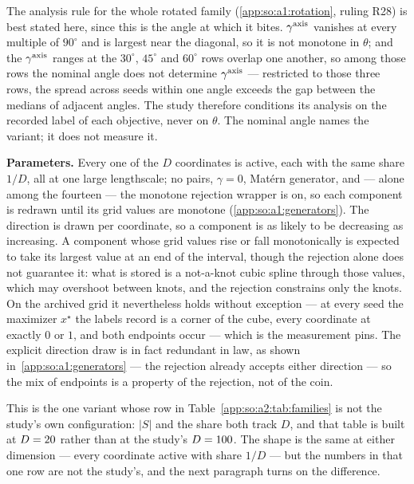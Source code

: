 The analysis rule for the whole rotated family (\ref{app:so:a1:rotation},
ruling R28) is best stated here, since this is the angle at which it bites.
$\gamma^{\mathrm{axis}}$ vanishes at every multiple of $90^\circ$ and is largest near the
diagonal, so it is not monotone in $\theta$; and the $\gamma^{\mathrm{axis}}$ ranges at the
$30^\circ$, $45^\circ$ and $60^\circ$ rows overlap one another, so among those
rows the nominal angle does not determine $\gamma^{\mathrm{axis}}$ --- restricted to those three
rows, the spread across seeds within one angle exceeds the gap between the
medians of adjacent angles. The study therefore conditions its analysis on the
recorded  label of each objective, never on $\theta$. The
nominal angle names the variant; it does not measure it.

\label{app:so:a2:dense-weak}

\textbf{Parameters.} Every one of the $D$ coordinates is active, each with the
same share $1/D$, all at one large lengthscale; no pairs, $\gamma=0$, Mat\'ern
generator, and --- alone among the fourteen --- the monotone rejection wrapper
is on, so each component is redrawn until its grid values are monotone
(\ref{app:so:a1:generators}). The direction is drawn per coordinate, so a
component is as likely to be decreasing as increasing. A component whose grid
values rise or fall monotonically is expected to take its largest value at an
end of the interval, though the rejection alone does not guarantee it: what is
stored is a not-a-knot cubic spline through those values, which may overshoot
between knots, and the rejection constrains only the knots. On the archived grid
it nevertheless holds without exception --- at every seed the maximizer
$x^\star$ the labels record is a corner of the cube, every coordinate at exactly
$0$ or $1$, and both endpoints occur --- which is the measurement
pins. The explicit direction draw is in fact redundant in law, as shown
in~\ref{app:so:a1:generators} --- the rejection already accepts either direction
--- so the mix of endpoints is a property of the rejection, not of the coin.

This is the one variant whose row in Table~\ref{app:so:a2:tab:families} is not
the study's own configuration: $|S|$ and the share both track $D$, and that
table is built at $D=20$ rather than at the study's
$D=100$. The shape is the same at either dimension --- every
coordinate active with share $1/D$ --- but the numbers in that one row are not
the study's, and the next paragraph turns on the difference.

